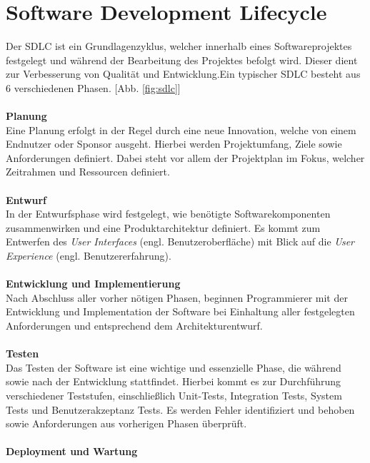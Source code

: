 \section{Software Development Lifecycle}
Der SDLC ist ein Grundlagenzyklus, welcher innerhalb eines Softwareprojektes festgelegt und während der Bearbeitung des Projektes befolgt wird. \cite*{SoftwareDevelopmentLife} Dieser dient zur Verbesserung von Qualität und Entwicklung.Ein typischer SDLC besteht aus 6 verschiedenen Phasen. [Abb. \ref{fig:sdlc}]\\\\
\textbf{Planung}\\[0.2cm]
Eine Planung erfolgt in der Regel durch eine neue Innovation, welche von einem Endnutzer oder Sponsor ausgeht. \cite*{tikySoftwareDevelopmentLife} Hierbei werden Projektumfang, Ziele sowie Anforderungen definiert. Dabei steht vor allem der Projektplan im Fokus, welcher Zeitrahmen und Ressourcen definiert. \cite*{hossainSoftwareDevelopmentLife2023}\\\\
\textbf{Entwurf}\\[0.2cm]
In der Entwurfsphase wird festgelegt, wie benötigte Softwarekomponenten zusammenwirken und eine Produktarchitektur definiert. Es kommt zum Entwerfen des \textit{User Interfaces} (engl. Benutzeroberfläche) mit Blick auf die \textit{User Experience} (engl. Benutzererfahrung). \cite*{hossainSoftwareDevelopmentLife2023}\\\\
\textbf{Entwicklung und Implementierung}\\[0.2cm]
Nach Abschluss aller vorher nötigen Phasen, beginnen Programmierer mit der Entwicklung und Implementation der Software bei Einhaltung aller festgelegten Anforderungen und entsprechend dem Architekturentwurf. \cite*{tikySoftwareDevelopmentLife} \\\\
\textbf{Testen}\\[0.2cm]
Das Testen der Software ist eine wichtige und essenzielle Phase, die während sowie nach der Entwicklung stattfindet. Hierbei kommt es zur Durchführung verschiedener Teststufen, einschließlich Unit-Tests, Integration Tests, System Tests und Benutzerakzeptanz Tests. Es werden Fehler identifiziert und behoben sowie Anforderungen aus vorherigen Phasen überprüft. \cite*{hossainSoftwareDevelopmentLife2023}\\\\
\textbf{Deployment und Wartung}\\[0.2cm]
